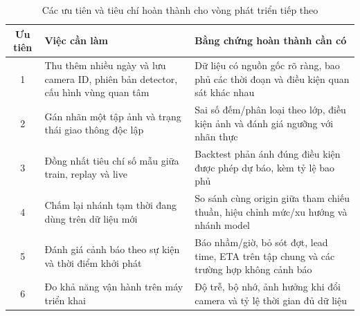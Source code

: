 \begin{table}[htbp]
        \centering
        \caption{Các ưu tiên và tiêu chí hoàn thành cho vòng phát triển tiếp theo}
        \label{tab:future_priorities}
        \begin{tabular}{|c|p{7.5cm}|p{7.5cm}|}
            \hline
            \textbf{Ưu tiên} & \textbf{Việc cần làm} & \textbf{Bằng chứng hoàn thành cần có} \\
            \hline
            1 & Thu thêm nhiều ngày và lưu camera ID, phiên bản detector, cấu hình vùng quan tâm & Dữ liệu có nguồn gốc rõ ràng, bao phủ các thời đoạn và điều kiện quan sát khác nhau \\
            \hline
            2 & Gán nhãn một tập ảnh và trạng thái giao thông độc lập & Sai số đếm/phân loại theo lớp, điều kiện ảnh và đánh giá ngưỡng với nhãn thực \\
            \hline
            3 & Đồng nhất tiêu chí số mẫu giữa train, replay và live & Backtest phản ánh đúng điều kiện được phép dự báo, kèm tỷ lệ bao phủ \\
            \hline
            4 & Chấm lại nhánh tạm thời đang dùng trên dữ liệu mới & So sánh cùng origin giữa tham chiếu thuần, hiệu chỉnh mức/xu hướng và nhánh model \\
            \hline
            5 & Đánh giá cảnh báo theo sự kiện và thời điểm khởi phát & Báo nhầm/giờ, bỏ sót đợt, lead time, ETA trên tập chung và các trường hợp không cảnh báo \\
            \hline
            6 & Đo khả năng vận hành trên máy triển khai & Độ trễ, bộ nhớ, ảnh hưởng khi đổi camera và tỷ lệ thời gian đủ dữ liệu \\
            \hline
        \end{tabular}
    \end{table}